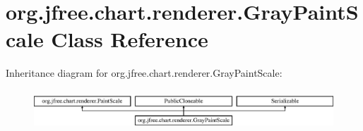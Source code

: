 \hypertarget{classorg_1_1jfree_1_1chart_1_1renderer_1_1_gray_paint_scale}{}\section{org.\+jfree.\+chart.\+renderer.\+Gray\+Paint\+Scale Class Reference}
\label{classorg_1_1jfree_1_1chart_1_1renderer_1_1_gray_paint_scale}
Inheritance diagram for org.\+jfree.\+chart.\+renderer.\+Gray\+Paint\+Scale\+:\begin{figure}[H]
\begin{center}
\leavevmode
\includegraphics[height=1.505376cm]{classorg_1_1jfree_1_1chart_1_1renderer_1_1_gray_paint_scale}
\end{center}
\end{figure}
